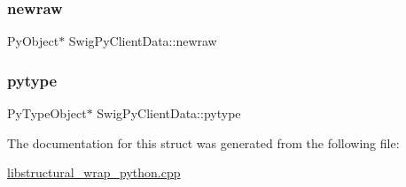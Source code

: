 \subsubsection{\texorpdfstring{newraw}{newraw}}
{\footnotesize\ttfamily Py\+Object$\ast$ Swig\+Py\+Client\+Data\+::newraw}

\mbox{\label{struct_swig_py_client_data_a1f172e51bb27f670dacdf8247843b4c2}} 
\subsubsection{\texorpdfstring{pytype}{pytype}}
{\footnotesize\ttfamily Py\+Type\+Object$\ast$ Swig\+Py\+Client\+Data\+::pytype}



The documentation for this struct was generated from the following file\+:\begin{DoxyCompactItemize}
\item 
\hyperlink{libstructural__wrap__python_8cpp}{libstructural\+\_\+wrap\+\_\+python.\+cpp}\end{DoxyCompactItemize}
